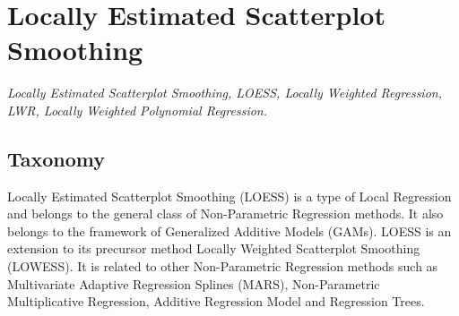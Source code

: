 
\section{Locally Estimated Scatterplot Smoothing} 
\label{sec:loess}

\emph{Locally Estimated Scatterplot Smoothing, LOESS, Locally Weighted Regression, LWR, Locally Weighted Polynomial Regression.}

\subsection{Taxonomy}
Locally Estimated Scatterplot Smoothing (LOESS) is a type of Local Regression and belongs to the general class of Non-Parametric Regression methods. It also belongs to the framework of Generalized Additive Models (GAMs).
LOESS is an extension to its precursor method Locally Weighted Scatterplot Smoothing (LOWESS).
It is related to other Non-Parametric Regression methods such as Multivariate Adaptive Regression Splines (MARS), Non-Parametric Multiplicative Regression, Additive Regression Model and Regression Trees. 

